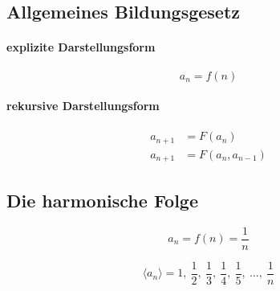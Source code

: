 \subsection{Allgemeines Bildungsgesetz}

\paragraph{explizite Darstellungsform}

\[
	a_n = f(n)
\]

\paragraph{rekursive Darstellungsform}

\begin{align*}
	a_{n+1} & = F(a_n)          \\
	a_{n+1} & = F(a_n, a_{n-1})
\end{align*}

\subsection{Die harmonische Folge}

\[
	a_n = f(n) = \frac{1}{n}
\]

\[
	\langle a_n \rangle = 1,\ \frac{1}{2},\ \frac{1}{3},\ \frac{1}{4},\ \frac{1}{5},\ \ldots,\ \frac{1}{n}
\]
